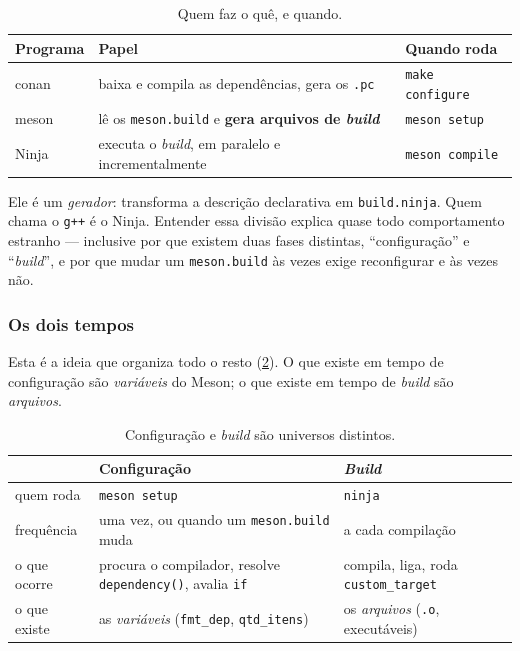 \begin{table}[htbp]
\centering
\caption{Quem faz o quê, e quando.}
\label{tab:tres-programas}
\footnotesize
\begin{tabular}{@{}lll@{}}
\toprule
\textbf{Programa} & \textbf{Papel} & \textbf{Quando roda} \\
\midrule
\gls{conan} & baixa e compila as dependências, gera os \texttt{.pc} & \texttt{make configure} \\
\gls{meson} & lê os \texttt{meson.build} e \textbf{gera arquivos de \emph{build}} & \texttt{meson setup} \\
Ninja       & executa o \emph{build}, em paralelo e incrementalmente & \texttt{meson compile} \\
\bottomrule
\end{tabular}
\end{table}

\begin{regra}
Ele é um \emph{gerador}: transforma a descrição declarativa em
\texttt{build.ninja}. Quem chama o \texttt{g++} é o Ninja. Entender essa divisão
explica quase todo comportamento estranho --- inclusive por que existem duas
fases distintas, ``configuração'' e ``\emph{build}'', e por que mudar um
\texttt{meson.build} às vezes exige reconfigurar e às vezes não.
\end{regra}

\subsubsection{Os dois tempos}

Esta é a ideia que organiza todo o resto (\cref{tab:dois-tempos}). O que existe
em tempo de configuração são \emph{variáveis} do Meson; o que existe em tempo de
\emph{build} são \emph{arquivos}.

\begin{table}[htbp]
\centering
\caption{Configuração e \emph{build} são universos distintos.}
\label{tab:dois-tempos}
\footnotesize
\begin{tabular}{@{}lll@{}}
\toprule
 & \textbf{Configuração} & \textbf{\emph{Build}} \\
\midrule
quem roda    & \texttt{meson setup}            & \texttt{ninja} \\
frequência   & uma vez, ou quando um \texttt{meson.build} muda & a cada compilação \\
o que ocorre & procura o compilador, resolve \texttt{dependency()}, avalia \texttt{if} & compila, liga, roda \texttt{custom\_target} \\
o que existe & as \emph{variáveis} (\texttt{fmt\_dep}, \texttt{qtd\_itens}) & os \emph{arquivos} (\texttt{.o}, executáveis) \\
\bottomrule
\end{tabular}
\end{table}

